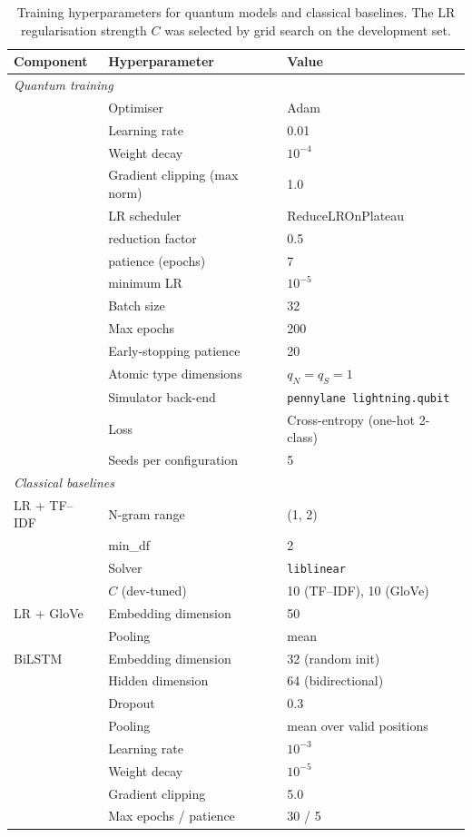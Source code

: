 \documentclass[11pt, a4paper]{article}
\begin{document}
\begin{table}[h!]
\centering
\caption{Training hyperparameters for quantum models and classical
baselines. The LR regularisation strength \(C\) was selected by
grid search on the development set.}
\label{tab:hparams}
\small
\begin{tabular}{lll}
\toprule
Component & Hyperparameter & Value \\
\midrule
\multicolumn{3}{l}{\emph{Quantum training}} \\
\midrule
& Optimiser & Adam \\
& Learning rate & 0.01 \\
& Weight decay & \(10^{-4}\) \\
& Gradient clipping (max norm) & 1.0 \\
& LR scheduler & ReduceLROnPlateau \\
& \quad reduction factor & 0.5 \\
& \quad patience (epochs) & 7 \\
& \quad minimum LR & \(10^{-5}\) \\
& Batch size & 32 \\
& Max epochs & 200 \\
& Early-stopping patience & 20 \\
& Atomic type dimensions & \(q_N = q_S = 1\) \\
& Simulator back-end & \texttt{pennylane lightning.qubit} \\
& Loss & Cross-entropy (one-hot 2-class) \\
& Seeds per configuration & 5 \\
\midrule
\multicolumn{3}{l}{\emph{Classical baselines}} \\
\midrule
LR + TF--IDF  & N-gram range & (1, 2) \\
              & min\_df & 2 \\
              & Solver & \texttt{liblinear} \\
              & \(C\) (dev-tuned) & 10 (TF--IDF), 10 (GloVe) \\
LR + GloVe    & Embedding dimension & 50 \\
              & Pooling & mean \\
BiLSTM        & Embedding dimension & 32 (random init) \\
              & Hidden dimension & 64 (bidirectional) \\
              & Dropout & 0.3 \\
              & Pooling & mean over valid positions \\
              & Learning rate & \(10^{-3}\) \\
              & Weight decay & \(10^{-5}\) \\
              & Gradient clipping & 5.0 \\
              & Max epochs / patience & 30 / 5 \\
\bottomrule
\end{tabular}
\end{table}
\end{document}
